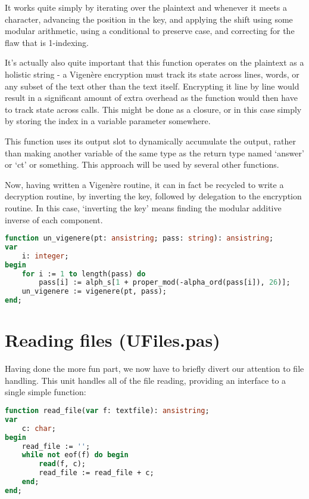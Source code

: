 \documentclass{article}
\begin{document}
    It works quite simply by iterating over the plaintext and whenever it meets
    a character, advancing the position in the key, and applying the shift
    using some modular arithmetic, using a conditional to preserve case, and
    correcting for the flaw that is 1-indexing.

    It's actually also quite important that this function operates on the
    plaintext as a holistic string - a Vigen\`ere encryption must track its
    state across lines, words, or any subset of the text other than the text
    itself. Encrypting it line by line would result in a significant amount of
    extra overhead as the function would then have to track state across calls.
    This might be done as a closure, or in this case simply by storing the
    index in a variable parameter somewhere.

    This function uses its output slot to dynamically accumulate the output,
    rather than making another variable of the same type as the return type
    named `answer' or `ct' or something. This approach will be used by several
    other functions.

    Now, having written a Vigen\`ere routine, it can in fact be recycled to
    write a decryption routine, by inverting the key, followed by delegation to
    the encryption routine. In this case, `inverting the key' means finding the
    modular additive inverse of each component.

\begin{lstlisting}[language=Pascal, caption=Vigen\`ere decryption]
function un_vigenere(pt: ansistring; pass: string): ansistring;
var
    i: integer;
begin
    for i := 1 to length(pass) do
        pass[i] := alph_s[1 + proper_mod(-alpha_ord(pass[i]), 26)];
    un_vigenere := vigenere(pt, pass);
end;
\end{lstlisting}

    \section{Reading files (UFiles.pas)}
    Having done the more fun part, we now have to briefly divert our attention
    to file handling. This unit handles all of the file reading, providing an
    interface to a single simple function:

\begin{lstlisting}[language=Pascal, caption=File-reading routine]
function read_file(var f: textfile): ansistring;
var
    c: char;
begin
    read_file := '';
    while not eof(f) do begin
        read(f, c);
        read_file := read_file + c;
    end;
end;
\end{lstlisting}
\end{document}
